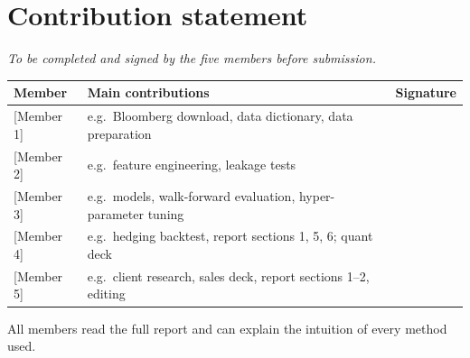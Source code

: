 \section{Contribution statement}\label{app:contribution}

\emph{To be completed and signed by the five members before submission.}

\begin{center}
\renewcommand{\arraystretch}{1.6}
\begin{tabular}{p{3.2cm}p{8.2cm}p{3.2cm}}
\toprule
\textbf{Member} & \textbf{Main contributions} & \textbf{Signature}\\
\midrule
{[Member 1]} & e.g.\ Bloomberg download, data dictionary, data preparation & \\
{[Member 2]} & e.g.\ feature engineering, leakage tests & \\
{[Member 3]} & e.g.\ models, walk-forward evaluation, hyper-parameter tuning & \\
{[Member 4]} & e.g.\ hedging backtest, report sections 1, 5, 6; quant deck & \\
{[Member 5]} & e.g.\ client research, sales deck, report sections 1--2, editing & \\
\bottomrule
\end{tabular}
\end{center}
All members read the full report and can explain the intuition of every method used.

